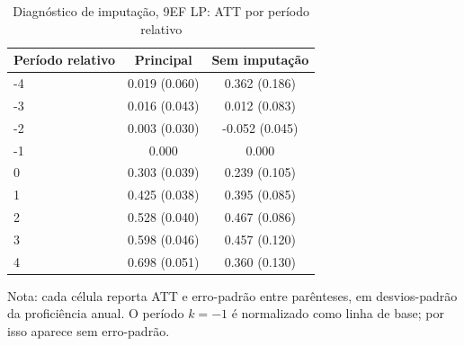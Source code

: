 \begin{table}[!htbp]
\centering
\caption{Diagnóstico de imputação, 9EF LP: ATT por período relativo}
\label{tab:ap_event_imputacao_9ef_lp}
\vspace{-0.15cm}
\scriptsize
\setlength{\tabcolsep}{4pt}
\renewcommand{\arraystretch}{0.92}
\begin{tabular}{lcc}
\toprule
Período relativo & Principal & Sem imputação \\
\midrule
-4 & 0.019 (0.060) & 0.362 (0.186) \\
-3 & 0.016 (0.043) & 0.012 (0.083) \\
-2 & 0.003 (0.030) & -0.052 (0.045) \\
-1 & 0.000 & 0.000 \\
0 & 0.303 (0.039) & 0.239 (0.105) \\
1 & 0.425 (0.038) & 0.395 (0.085) \\
2 & 0.528 (0.040) & 0.467 (0.086) \\
3 & 0.598 (0.046) & 0.457 (0.120) \\
4 & 0.698 (0.051) & 0.360 (0.130) \\
\bottomrule
\end{tabular}
\begin{flushleft}
\footnotesize Nota: cada célula reporta ATT e erro-padrão entre parênteses, em desvios-padrão da proficiência anual. O período \(k=-1\) é normalizado como linha de base; por isso aparece sem erro-padrão.
\end{flushleft}
\end{table}

